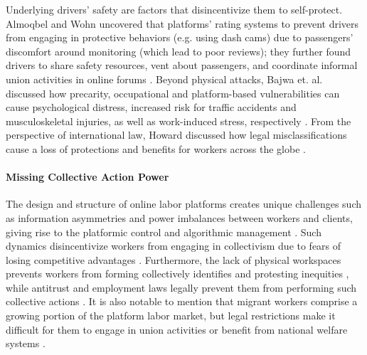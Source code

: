 Underlying drivers' safety are factors that disincentivize them to self-protect. Almoqbel and Wohn uncovered that platforms' rating systems to prevent drivers from engaging in protective behaviors (e.g. using dash cams) due to passengers' discomfort around monitoring (which lead to poor reviews); they further found drivers to share safety resources, vent about passengers, and coordinate informal union activities in online forums \cite{Almoqbel2019-in}. Beyond physical attacks, Bajwa et. al. discussed how precarity, occupational and platform-based vulnerabilities can cause psychological distress, increased risk for traffic accidents and musculoskeletal injuries, as well as work-induced stress, respectively \cite{Bajwa2018-gy}. From the  perspective of international law, Howard discussed how legal misclassifications cause a loss of protections and benefits for workers across the globe \cite{Howard2017-wd}.


\paragraph{Missing Collective Action Power}
The design and structure of online labor platforms creates unique challenges such as information asymmetries and power imbalances between workers and clients, giving rise to the platformic control and algorithmic management \cite{Lampinen2018-sv,Jarrahi2019-if, precarity, platform_manage,Gray2019-ue, power, Rosenblat_Stark_2016}. 
Such dynamics disincentivize workers from engaging in collectivism due to fears of losing competitive advantages \cite{atom}. Furthermore, the lack of physical workspaces prevents workers from forming collectively identifies and protesting inequities \cite{chesta2019labour, calacci2022organizing}, while antitrust and employment laws legally prevent them from performing such collective actions \cite{anwar2020precarity, paul2019fissuring}. It is also notable to mention that migrant workers comprise a growing portion of the platform labor market, but legal restrictions make it difficult for them to engage in union activities or benefit from national welfare systems \cite{van2020migration}.

